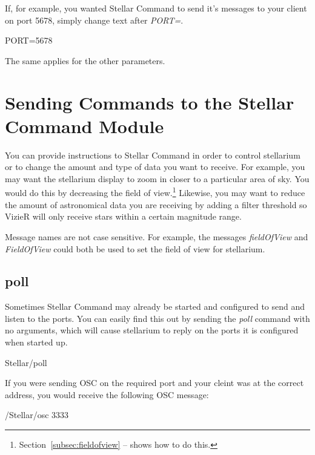 If, for example, you wanted Stellar Command to send it's messages to your client on port 5678, simply change text after  \textit{PORT=}.
 \begin{syntax} 
	\medskip
	PORT=5678\\
	\medskip
\end{syntax}
\bigskip

The same applies for the other parameters.

\section{Sending Commands to the Stellar Command Module}
You can provide instructions to Stellar Command in order to control stellarium or to change the amount and type of data you want to receive. For example, you may want the stellarium display to zoom in closer to a particular area of sky. You would do this by decreasing the field of view.\footnote{Section~\ref{subsec:fieldofview} --
	\emph{} shows how to do this.} Likewise, you may want to reduce the amount of astronomical data you are receiving by adding a filter threshold so VizieR will only receive stars within a certain magnitude range. 

Message names are not case sensitive. For example, the messages \textit{fieldOfView} and \textit{FieldOfView} could both be used to set the field of view for stellarium.

\subsection{poll} 
Sometimes Stellar Command may already be started and configured to send and listen to the ports. You can easily find this out by sending the \textit{poll} command with no arguments, which will cause stellarium to reply on the ports it is configured when started up.

 \begin{syntax}
	\medskip
	Stellar/poll
	\medskip
\end{syntax}

If you were sending OSC on the required port and your cleint was at the correct address, you would receive the following OSC message:
\begin{syntax}
	/Stellar/osc 3333  \\
\end{syntax}
\bigskip


